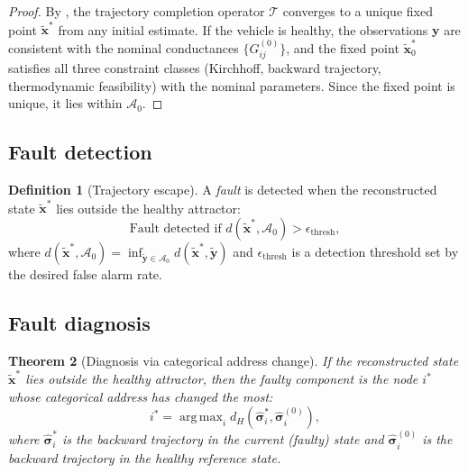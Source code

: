 \documentclass[twocolumn,10pt,a4paper]{article}
\newtheorem{theorem}{Theorem}[section]
\theoremstyle{definition}
\newtheorem{definition}[theorem]{Definition}
\theoremstyle{remark}
\newcommand{\Tcal}{\mathcal{T}}
\newcommand{\vect}[1]{\boldsymbol{#1}}
\newcommand{\fuzzy}[1]{\widetilde{#1}}
\DeclareMathOperator*{\argmax}{arg\,max}
\begin{document}
\begin{proof}
By , the trajectory completion operator $\Tcal$ converges to a unique fixed point $\fuzzy{\vect{x}}^*$ from any initial estimate. If the vehicle is healthy, the observations $\vect{y}$ are consistent with the nominal conductances $\{G_{ij}^{(0)}\}$, and the fixed point $\fuzzy{\vect{x}}^*_0$ satisfies all three constraint classes (Kirchhoff, backward trajectory, thermodynamic feasibility) with the nominal parameters. Since the fixed point is unique, it lies within $\mathcal{A}_0$.
\end{proof}

\subsection{Fault detection}

\begin{definition}[Trajectory escape]\label{def:trajectory_escape}
A \emph{fault} is detected when the reconstructed state $\fuzzy{\vect{x}}^*$ lies outside the healthy attractor:
\begin{equation}\label{eq:fault_detection}
\text{Fault detected if } d(\fuzzy{\vect{x}}^*, \mathcal{A}_0) > \epsilon_{\mathrm{thresh}},
\end{equation}
where $d(\fuzzy{\vect{x}}^*, \mathcal{A}_0) = \inf_{\fuzzy{\vect{y}} \in \mathcal{A}_0} d(\fuzzy{\vect{x}}^*, \fuzzy{\vect{y}})$ and $\epsilon_{\mathrm{thresh}}$ is a detection threshold set by the desired false alarm rate.
\end{definition}

\subsection{Fault diagnosis}

\begin{theorem}[Diagnosis via categorical address change]\label{thm:diagnosis}
If the reconstructed state $\fuzzy{\vect{x}}^*$ lies outside the healthy attractor, then the faulty component is the node $i^*$ whose categorical address has changed the most:
\begin{equation}\label{eq:fault_diagnosis}
i^* = \argmax_i d_H(\hat{\vect{\sigma}}_i^*, \hat{\vect{\sigma}}_i^{(0)}),
\end{equation}
where $\hat{\vect{\sigma}}_i^*$ is the backward trajectory in the current (faulty) state and $\hat{\vect{\sigma}}_i^{(0)}$ is the backward trajectory in the healthy reference state.
\end{theorem}
\end{document}
